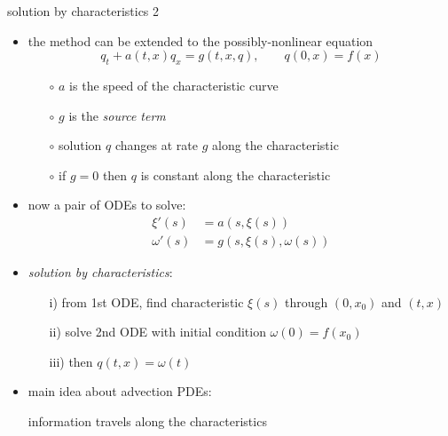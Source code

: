\documentclass[10pt,hyperref]{beamer}
\begin{document}
\begin{frame}{solution by characteristics 2}

\begin{itemize}
\item the method can be extended to the possibly-nonlinear equation
     $$q_t + a(t,x) q_x = g(t,x,q), \qquad q(0,x) = f(x)$$

    \begin{itemize}
    \item[$\circ$] $a$ is the speed of the characteristic curve
    \item[$\circ$] $g$ is the \emph{source term}
    \item[$\circ$] solution $q$ changes at rate $g$ along the characteristic
    \item[$\circ$] if $g=0$ then $q$ is constant along the characteristic
    \end{itemize}
\item now a pair of ODEs to solve:
\begin{align*}
\xi'(s) &= a(s,\xi(s)) \\
\omega'(s) &= g(s,\xi(s),\omega(s))
\end{align*}
\item \emph{solution by characteristics}:
    \begin{itemize}
    \item[i)] from 1st ODE, find characteristic $\xi(s)$ through $(0,x_0)$ and $(t,x)$
    \item[ii)] solve 2nd ODE with initial condition $\omega(0)=f(x_0)$
    \item[iii)] then $q(t,x) = \omega(t)$
    \end{itemize}
\item \alert{main idea} about advection PDEs:

\begin{center}
information travels along the characteristics
\end{center}
\end{itemize}
\end{frame}
\end{document}
